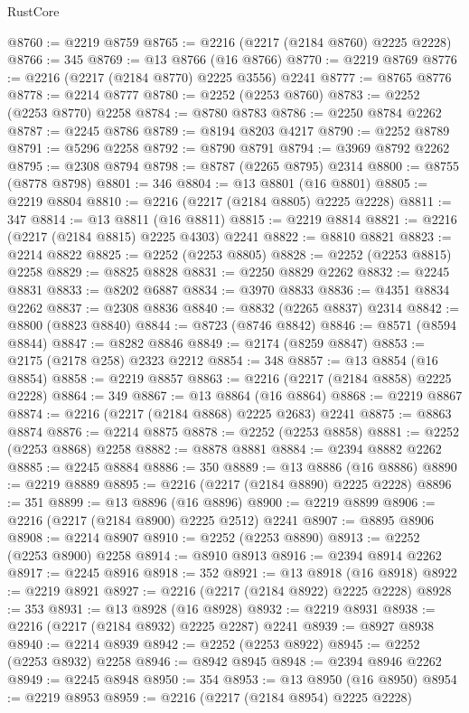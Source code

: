 \begin{lexlean}{RustCore}
\begin{coremodule}
@8760 := @2219 @8759
@8765 := @2216 (@2217 (@2184 @8760) @2225 @2228)
@8766 := 345
@8769 := @13 @8766 (@16 @8766)
@8770 := @2219 @8769
@8776 := @2216 (@2217 (@2184 @8770) @2225 @3556) @2241
@8777 := @8765 @8776
@8778 := @2214 @8777
@8780 := @2252 (@2253 @8760)
@8783 := @2252 (@2253 @8770) @2258
@8784 := @8780 @8783
@8786 := @2250 @8784 @2262
@8787 := @2245 @8786
@8789 := @8194 @8203 @4217
@8790 := @2252 @8789
@8791 := @5296 @2258
@8792 := @8790 @8791
@8794 := @3969 @8792 @2262
@8795 := @2308 @8794
@8798 := @8787 (@2265 @8795) @2314
@8800 := @8755 (@8778 @8798)
@8801 := 346
@8804 := @13 @8801 (@16 @8801)
@8805 := @2219 @8804
@8810 := @2216 (@2217 (@2184 @8805) @2225 @2228)
@8811 := 347
@8814 := @13 @8811 (@16 @8811)
@8815 := @2219 @8814
@8821 := @2216 (@2217 (@2184 @8815) @2225 @4303) @2241
@8822 := @8810 @8821
@8823 := @2214 @8822
@8825 := @2252 (@2253 @8805)
@8828 := @2252 (@2253 @8815) @2258
@8829 := @8825 @8828
@8831 := @2250 @8829 @2262
@8832 := @2245 @8831
@8833 := @8202 @6887
@8834 := @3970 @8833
@8836 := @4351 @8834 @2262
@8837 := @2308 @8836
@8840 := @8832 (@2265 @8837) @2314
@8842 := @8800 (@8823 @8840)
@8844 := @8723 (@8746 @8842)
@8846 := @8571 (@8594 @8844)
@8847 := @8282 @8846
@8849 := @2174 (@8259 @8847)
@8853 := @2175 (@2178 @258) @2323 @2212
@8854 := 348
@8857 := @13 @8854 (@16 @8854)
@8858 := @2219 @8857
@8863 := @2216 (@2217 (@2184 @8858) @2225 @2228)
@8864 := 349
@8867 := @13 @8864 (@16 @8864)
@8868 := @2219 @8867
@8874 := @2216 (@2217 (@2184 @8868) @2225 @2683) @2241
@8875 := @8863 @8874
@8876 := @2214 @8875
@8878 := @2252 (@2253 @8858)
@8881 := @2252 (@2253 @8868) @2258
@8882 := @8878 @8881
@8884 := @2394 @8882 @2262
@8885 := @2245 @8884
@8886 := 350
@8889 := @13 @8886 (@16 @8886)
@8890 := @2219 @8889
@8895 := @2216 (@2217 (@2184 @8890) @2225 @2228)
@8896 := 351
@8899 := @13 @8896 (@16 @8896)
@8900 := @2219 @8899
@8906 := @2216 (@2217 (@2184 @8900) @2225 @2512) @2241
@8907 := @8895 @8906
@8908 := @2214 @8907
@8910 := @2252 (@2253 @8890)
@8913 := @2252 (@2253 @8900) @2258
@8914 := @8910 @8913
@8916 := @2394 @8914 @2262
@8917 := @2245 @8916
@8918 := 352
@8921 := @13 @8918 (@16 @8918)
@8922 := @2219 @8921
@8927 := @2216 (@2217 (@2184 @8922) @2225 @2228)
@8928 := 353
@8931 := @13 @8928 (@16 @8928)
@8932 := @2219 @8931
@8938 := @2216 (@2217 (@2184 @8932) @2225 @2287) @2241
@8939 := @8927 @8938
@8940 := @2214 @8939
@8942 := @2252 (@2253 @8922)
@8945 := @2252 (@2253 @8932) @2258
@8946 := @8942 @8945
@8948 := @2394 @8946 @2262
@8949 := @2245 @8948
@8950 := 354
@8953 := @13 @8950 (@16 @8950)
@8954 := @2219 @8953
@8959 := @2216 (@2217 (@2184 @8954) @2225 @2228)

\end{coremodule}
\end{lexlean}
